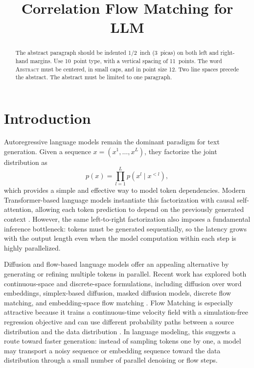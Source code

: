 \documentclass{article} %
\title{Correlation Flow Matching for LLM}
\author{
}
\begin{document}
\maketitle

\begin{abstract}
The abstract paragraph should be indented 1/2~inch (3~picas) on both left and
right-hand margins. Use 10~point type, with a vertical spacing of 11~points.
The word \textsc{Abstract} must be centered, in small caps, and in point size 12. Two
line spaces precede the abstract. The abstract must be limited to one
paragraph.
\end{abstract}

\section{Introduction}
Autoregressive language models remain the dominant paradigm for text generation. 
Given a sequence $x=(x^1,\ldots,x^L)$, they factorize the joint distribution as
\begin{equation}
    p(x)=\prod_{l=1}^{L} p(x^l \mid x^{<l}),
\end{equation}
which provides a simple and effective way to model token dependencies. 
Modern Transformer-based language models instantiate this factorization with causal self-attention, allowing each token prediction to depend on the previously generated context \citep{vaswani2017attention}. 
However, the same left-to-right factorization also imposes a fundamental inference bottleneck: tokens must be generated sequentially, so the latency grows with the output length even when the model computation within each step is highly parallelized.

Diffusion and flow-based language models offer an appealing alternative by generating or refining multiple tokens in parallel. 
Recent work has explored both continuous-space and discrete-space formulations, including diffusion over word embeddings, simplex-based diffusion, masked diffusion models, discrete flow matching, and embedding-space flow matching \citep{li2022diffusionlm,han2023ssdlm,gulrajani2023likelihood,gat2024discreteflow,nie2025large,ye2025dream,hu2026elf}. 
Flow Matching is especially attractive because it trains a continuous-time velocity field with a simulation-free regression objective and can use different probability paths between a source distribution and the data distribution \citep{lipman2023flowmatching}. 
In language modeling, this suggests a route toward faster generation: instead of sampling tokens one by one, a model may transport a noisy sequence or embedding sequence toward the data distribution through a small number of parallel denoising or flow steps.
\end{document}
